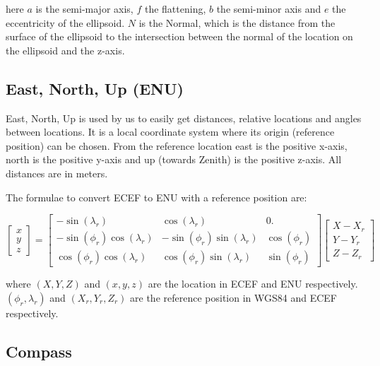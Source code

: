 \noindent
here $a$ is the semi-major axis, $f$ the flattening, $b$ the semi-minor
axis and $e$ the eccentricity of the ellipsoid. $N$ is the Normal, which
is the distance from the surface of the ellipsoid to the intersection
between the normal of the location on the ellipsoid and the z-axis.


\subsection{East, North, Up (ENU)}

East, North, Up is used by us to easily get distances, relative locations
and angles between locations. It is a local coordinate system where its
origin (reference position) can be chosen. From the reference location
east is the positive x-axis, north is the positive y-axis and up (towards
Zenith) is the positive z-axis. All distances are in meters.

The formulae to convert ECEF to ENU with a reference position are:

\begin{equation}
    \begin{bmatrix}
    x \\ y \\ z
    \end{bmatrix}
    =
    \begin{bmatrix}
                 -\sin(\lambda_r) &               \cos(\lambda_r) &           0. \\
    -\sin(\phi_r) \cos(\lambda_r) & -\sin(\phi_r) \sin(\lambda_r) & \cos(\phi_r) \\
     \cos(\phi_r) \cos(\lambda_r) &  \cos(\phi_r) \sin(\lambda_r) & \sin(\phi_r)
    \end{bmatrix}
    \begin{bmatrix}
    X - X_r \\ Y - Y_r \\ Z - Z_r
    \end{bmatrix}
\end{equation}

where  $(X, Y, Z)$ and $(x, y, z)$ are the location in ECEF and ENU
respectively. $(\phi_r, \lambda_r)$ and $(X_r, Y_r, Z_r)$ are the
reference position in WGS84 and ECEF respectively.


\subsection{Compass}

